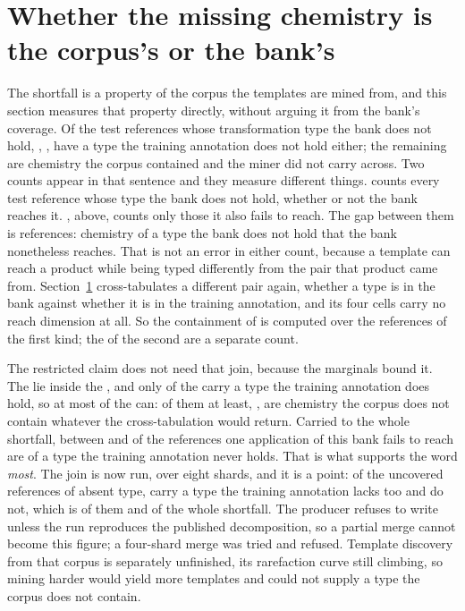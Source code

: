 \documentclass[journal=jcisd8,manuscript=suppinfo,layout=onecolumn]{achemso}
\begin{document}
\section{Whether the missing chemistry is the corpus's or the bank's}
\label{sec:si-typeoverlap}

The shortfall is a property of the corpus the templates are mined from, and this section measures
that property directly, without arguing it from the bank's coverage. Of the
\numTypeoverlapBanklacks{} test
references whose transformation type the bank does not hold, \numTypeoverlapCorpuslackstoo{},
\numTypeoverlapCorpussharePct{}, have a type the training annotation does not hold either; the
remaining \numTypeoverlapMinerslost{} are chemistry the corpus contained and the miner did not
carry across. Two counts appear in that sentence and they measure different things.
\numTypeoverlapBanklacks{} counts every test reference whose type the bank does not hold, whether
or not the bank reaches it. \numCeilingNovel{}, above, counts only those it also fails to reach.
The gap between them is \numTypeoverlapReached{} references: chemistry of a type the bank does not
hold that the bank nonetheless reaches. That is not an error in either count, because a template can
reach a product while being typed differently from the pair that product came from.
Section~\ref{sec:si-typeoverlap} cross-tabulates a different pair again, whether a type is in the
bank against whether it is in the training annotation, and its four cells carry no reach dimension
at all. So the containment of \numTypeoverlapCorpussharePct{} is computed over the
\numTypeoverlapBanklacks{} references of the first kind; the \numCeilingNovel{} of the second are a
separate count.

The restricted claim does not need that join, because the marginals bound it. The
\numCeilingNovel{} lie inside the \numTypeoverlapBanklacks{}, and only
\numTypeoverlapMinerslost{} of the \numTypeoverlapBanklacks{} carry a type the training annotation
does hold, so at most \numTypeoverlapMinerslost{} of the \numCeilingNovel{} can:
\numBoundCorpusabsentmin{} of them at least, \numBoundCorpusabsentsharemin{}, are chemistry the
corpus does not contain whatever the cross-tabulation would return. Carried to the whole shortfall,
between \numBoundShortfallsharemin{} and \numBoundShortfallsharemax{} of the
\numCeilingUncovered{} references one application of this bank fails to reach are of a type the
training annotation never holds. That is what supports the word \emph{most}. The join is now run,
over eight shards, and it is a point: of the \numCeilingNovel{} uncovered references of absent type,
\numContainmentAbsent{} carry a type the training annotation lacks too and \numContainmentPresentWord{} do
not, which is \numContainmentSharePct{} of them and \numContainmentShortfallsharePct{} of the whole
shortfall. The producer refuses to write unless the run reproduces the published decomposition,
so a partial merge cannot become this figure; a four-shard merge was tried and refused. Template discovery from that
corpus is separately unfinished, its rarefaction curve still climbing, so mining harder would yield
more templates and could not supply a type the corpus does not contain.
\end{document}
